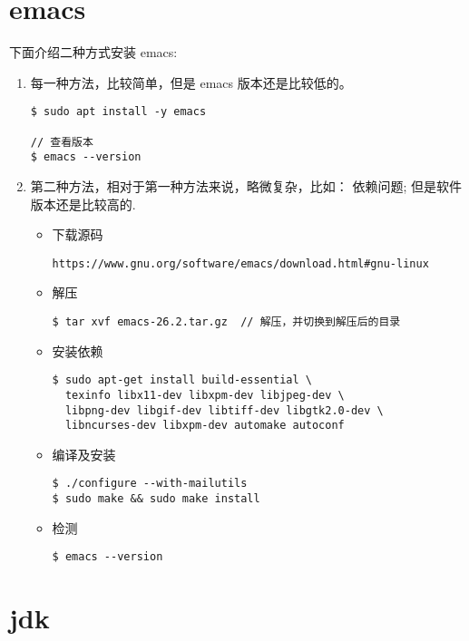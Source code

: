 \section{emacs}
下面介绍二种方式安装 emacs:
\flushleft
\begin{enumerate}
\item 每一种方法，比较简单，但是 emacs 版本还是比较低的。
\begin{lstlisting}
$ sudo apt install -y emacs 

// 查看版本
$ emacs --version  
\end{lstlisting}

\item 第二种方法，相对于第一种方法来说，略微复杂，比如： 依赖问题;
但是软件版本还是比较高的.

\begin{itemize}
\item 下载源码 \\ 
\begin{lstlisting}
https://www.gnu.org/software/emacs/download.html#gnu-linux
\end{lstlisting}

\item 解压
\begin{lstlisting}
$ tar xvf emacs-26.2.tar.gz  // 解压，并切换到解压后的目录
\end{lstlisting}

\item 安装依赖
\begin{lstlisting}
$ sudo apt-get install build-essential \
  texinfo libx11-dev libxpm-dev libjpeg-dev \
  libpng-dev libgif-dev libtiff-dev libgtk2.0-dev \
  libncurses-dev libxpm-dev automake autoconf 
\end{lstlisting}

\item 编译及安装
\begin{lstlisting}
$ ./configure --with-mailutils 
$ sudo make && sudo make install  
\end{lstlisting}

\item 检测
\begin{lstlisting}
$ emacs --version
\end{lstlisting}

\end{itemize}
\end{enumerate}
\newpage

\section{jdk}


